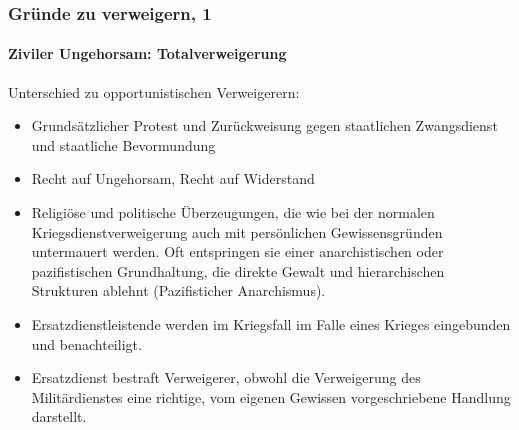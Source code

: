 \documentclass{beamer}
\begin{document}
	\begin{frame}
		\frametitle{Gründe zu verweigern, 1}
		\framesubtitle{Ziviler Ungehorsam: Totalverweigerung}
		Unterschied zu opportunistischen Verweigerern:
		\begin{itemize}
			\item Grundsätzlicher Protest und Zurückweisung gegen staatlichen Zwangsdienst und staatliche Bevormundung
			\item Recht auf Ungehorsam, Recht auf Widerstand
			\item Religiöse und politische Überzeugungen, die wie bei der normalen Kriegsdienstverweigerung auch mit persönlichen Gewissensgründen untermauert werden. Oft entspringen sie einer anarchistischen oder pazifistischen Grundhaltung, die direkte Gewalt und hierarchischen Strukturen ablehnt (Pazifisticher Anarchismus).
			\item Ersatzdienstleistende werden im Kriegsfall im Falle eines Krieges eingebunden und benachteiligt.
			\item Ersatzdienst bestraft Verweigerer, obwohl die Verweigerung des Militärdienstes eine richtige, vom eigenen Gewissen vorgeschriebene Handlung darstellt.
		\end{itemize}
	\end{frame}
	
\end{document}
